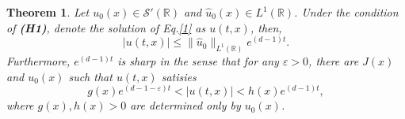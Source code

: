 \documentclass[12pt]{article}
\newcommand{\R}{\mathbb{R}}
\newtheorem{theorem}{Theorem}
\begin{document}
\begin{theorem}\label{thm1}
 Let $u_{0}(x)\in \mathscr{S}'(\mathbb{R})$ and $\hat{u}_{0}(x)\in L^{1}(\R)$. Under the condition of \textbf{(H1)}, denote the solution of Eq.\eqref{1} as \(u(t,x)\), then,
\begin{equation}\label{T1}
	|u(t,x)|\leq \|\hat{u}_0\|_{L^1(\R)}e^{(d-1)t}.
\end{equation}
Furthermore, $e^{(d-1)t}$ is sharp in the sense that for any $\varepsilon>0$, there are $J(x)$ and $  u_0(x)$  such that $u(t,x)$ satisies 
\begin{equation}\label{T2}
		g(x)e^{(d-1-\varepsilon)t}<|u(t,x)|<h(x)e^{(d-1)t},
\end{equation}
 where $g(x), h(x)>0$ are determined only by $u_{0}(x)$. 
\end{theorem}
\end{document}
